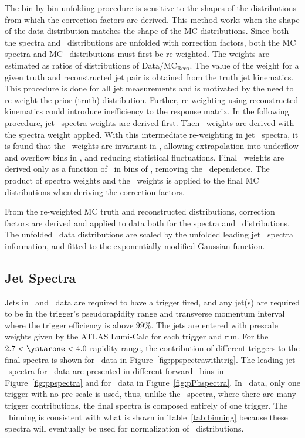 The bin-by-bin unfolding procedure is sensitive to the shapes of the distributions from which the correction factors are derived. This method works when the shape of the data distribution matches the shape of the MC distributions. Since both the spectra and \Dphi\ distributions are unfolded with correction factors, both the MC spectra and MC \Dphi\ distributions must first be re-weighted. The weights are estimated as ratios of distributions of $\mathrm{Data/MC_{Reco}}$. The value of the weight for a given truth and reconstructed jet pair is obtained from the truth jet kinematics. This procedure is done for all jet measurements and is motivated by the need to re-weight the prior (truth) distribution. Further, re-weighting using reconstructed kinematics could introduce inefficiency to the response matrix. In the following procedure, jet \pt\ spectra weights are derived first. Then \Dphi\ weights are derived with the spectra weight applied. With this intermediate re-weighting in jet \pt\ spectra, it is found that the \Dphi\ weights are invariant in \pT, allowing extrapolation into underflow and overflow bins in \pT, and reducing statistical fluctuations. Final \Dphi\ weights are derived only as a function of \Dphi\ in bins of \ystar, removing the \pT\ dependence. The product of spectra weights and the \Dphi\ weights is applied to the final MC distributions when deriving the correction factors.

From the re-weighted MC truth and reconstructed distributions, correction factors are derived and applied to data both for the spectra and \Dphi\ distributions. The unfolded \Dphi\ data distributions are scaled by the unfolded leading jet \pt\ spectra information, and fitted to the exponentially modified Gaussian function. 


\subsection{Jet Spectra}

Jets in \pp\ and \pPb\ data are required to have a trigger fired, and any jet(s) are required to be in the trigger's pseudorapidity range and transverse momentum interval where the trigger efficiency is above $99\%$. The jets are entered with prescale weights given by the ATLAS Lumi-Calc for each trigger and run. For the $2.7<\ystarone<4.0$ rapidity range, the contribution of different triggers to the final spectra is shown for \pp\ data in Figure~\ref{fig:ppspectrawithtrig}. The leading jet \pt\ spectra for \pp\ data are presented in different forward \ystar\ bins in Figure~\ref{fig:ppspectra} and for \pPb\ data in Figure~\ref{fig:pPbspectra}. In \pPb\ data, only one trigger with no pre-scale is used, thus, unlike the \pp\ spectra, where there are many trigger contributions, the final spectra is composed entirely of one trigger. The \pT\ binning is consistent with what is shown in Table~\ref{tab:binning} because these spectra will eventually be used for normalization of \Dphi\ distributions.

